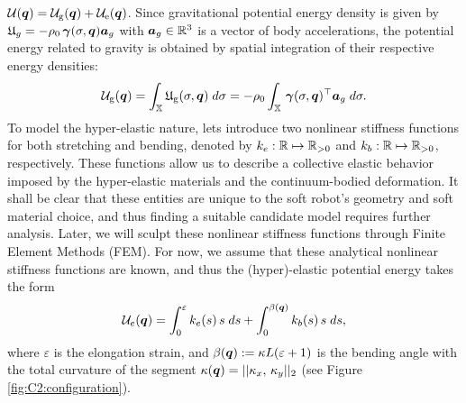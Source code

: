 $\mathcal{U}({\boldsymbol{q}}) = \mathcal{U}_{\scriptstyle\textrm{g}}({\boldsymbol{q}}) + \mathcal{U}_{\scriptstyle\textrm{e}}({\boldsymbol{q}})
$. Since gravitational potential energy density is given by $\mathfrak{U}_g = -\rho_0\,{\boldsymbol{\gamma}}(\sigma,{\boldsymbol{q}}) \boldsymbol{a}_g$ with $\boldsymbol{a}_g \in \mathbb{R}^3$ is a vector of body accelerations, the potential energy related to gravity is obtained by spatial integration of their respective energy densities:
%
\begin{equation}
\mathcal{U}_{\scriptstyle\textrm{g}}({\boldsymbol{q}}) = \int_{\mathbb{X}} \mathfrak{U}_{\scriptstyle\textrm{g}}(\sigma,{\boldsymbol{q}}) \; d\sigma = - \rho_0 \int_{\mathbb{X}} \,{\boldsymbol{\gamma}}(\sigma,{\boldsymbol{q}})^\top \boldsymbol{a}_g \; d \sigma.
\label{eq:C2:potential_energy_grav}
\end{equation}
%
\noindent To model the hyper-elastic nature, lets introduce two nonlinear stiffness functions for both stretching and bending, denoted by $k_e: \mathbb{R} \mapsto \mathbb{R}_{>0}$ and $k_b: \mathbb{R} \mapsto \mathbb{R}_{>0}$, respectively. These functions allow us to describe a collective elastic behavior imposed by the hyper-elastic materials and the continuum-bodied deformation. It shall be clear that these entities are unique to the soft robot's geometry and soft material choice, and thus finding a suitable candidate model requires further analysis. Later, we will sculpt these nonlinear stiffness functions through Finite Element Methods (FEM). For now, we assume that these analytical nonlinear stiffness functions are known, and thus the (hyper)-elastic potential energy takes the form
%
\begin{equation}
\mathcal{U}_e({\boldsymbol{q}}) = \int_0^{\varepsilon} k_e(s) \,s \; d s + \int_0^{\beta({\boldsymbol{q}})} k_b(s)\, s \; d s,
\label{eq:C2:potential_energy_elas}
\end{equation}
%
where $\varepsilon$ is the elongation strain, and $\beta({\boldsymbol{q}}) := \kappa L(\varepsilon + 1)$ is the bending angle with the total curvature of the segment $\kappa({\boldsymbol{q}}) = || \kappa_x, \,\kappa_y ||_2$ (see Figure \ref{fig:C2:configuration}).

